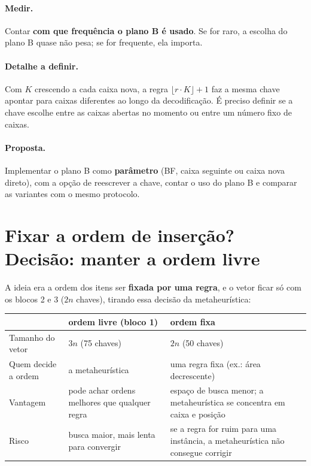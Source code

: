 \documentclass[11pt,a4paper]{article}
\begin{document}
\paragraph{Medir.} Contar \textbf{com que frequência o plano B é usado}. Se for raro, a escolha do plano B quase não pesa;
se for frequente, ela importa.

\paragraph{Detalhe a definir.} Com $K$ crescendo a cada caixa nova, a regra $\lfloor r\cdot K\rfloor+1$ faz a mesma chave
apontar para caixas diferentes ao longo da decodificação. É preciso definir se a chave escolhe entre as caixas abertas
no momento ou entre um número fixo de caixas.

\paragraph{Proposta.} Implementar o plano B como \textbf{parâmetro} (BF, caixa seguinte ou caixa nova direto), com a opção
de reescrever a chave, contar o uso do plano B e comparar as variantes com o mesmo protocolo.


\section{Fixar a ordem de inserção? Decisão: manter a ordem livre}\label{sec:ordem}
A ideia era a ordem dos itens ser \textbf{fixada por uma regra}, e o vetor ficar só com os blocos 2 e 3 ($2n$ chaves),
tirando essa decisão da metaheurística:

\begin{center}\small
\begin{tabular}{@{}>{\raggedright\arraybackslash}p{3.6cm}>{\raggedright\arraybackslash}p{5.6cm}>{\raggedright\arraybackslash}p{6.4cm}@{}}
\toprule
& ordem livre (bloco 1) & ordem fixa \\ \midrule
Tamanho do vetor & $3n$ (75 chaves) & $2n$ (50 chaves) \\
Quem decide a ordem & a metaheurística & uma regra fixa (ex.: área decrescente) \\
Vantagem & pode achar ordens melhores que qualquer regra & espaço de busca menor; a metaheurística se concentra em
caixa e posição \\
Risco & busca maior, mais lenta para convergir & se a regra for ruim para uma instância, a metaheurística não consegue
corrigir \\
\bottomrule
\end{tabular}
\end{center}
\end{document}
